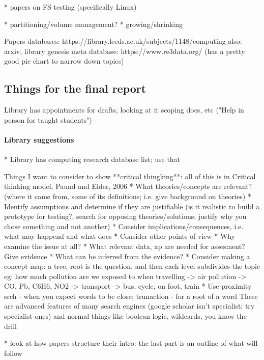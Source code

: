 \documentclass[a4paper]{report}
\begin{document}
        * papers on FS testing (specifically Linux)

        * partitioning/volume management?
        * growing/shrinking

        Papers databases: https://library.leeds.ac.uk/subjects/1148/computing
        also: arxiv, library genesis
        meta database: https://www.re3data.org/ (has a pretty good pie chart to narrow down topics)

    \subsection{Things for the final report}
        Library has appointments for drafts, looking at it scoping docs, etc ("Help in person for taught students")
        \paragraph{Library suggestions}
        * Library has computing research database list; use that

        Things I want to consider to show **critical thingking**:
        all of this is in Critical thinking model, Paund and Elder, 2006
        * What theories/concepts are relevant?
          (where it came from, some of its definitions; i.e. give background on theories)
        * Identify assumptions and determine if they are justifiable
          (is it realistic to build a prototype for testing?, search for opposing
          theories/solutions; justify why you chose something and not another)
        * Consider implications/consequences, i.e. what may happend and what does
        * Consider other points of view
        * Why examine the issue at all?
        * What relevant data, xp are needed for assesment? Give evidence
        * What can be inferred from the evidence?
        * Consider making a concept map: a tree, root is the question, and then each level subdivides the topic
          eg: how much pollution are we exposed to when travelling -> air pollution -> CO, Pb, C6H6, NO2
                                                 -> transport    -> bus, cycle, on foot, train
        * Use proximity srch - when you expect words to be close; trunaction - for a root of a word
        These are advanced features of many search engines (google scholar isn't specialist; try specialist ones)
        and normal things like boolean logic, wildcards, you know the drill

        * look at how papers structure their intro: the last part is an outline of what will follow
\end{document}
